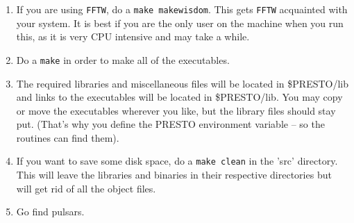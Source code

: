 \documentclass[11pt]{article}
\begin{document}
\begin{enumerate}
\item If you are using {\tt FFTW}, do a {\tt make makewisdom}.  This
  gets {\tt FFTW} acquainted with your system.  It is best if you are
  the only user on the machine when you run this, as it is very CPU
  intensive and may take a while.
  
\item Do a {\tt make} in order to make all of the executables.
  
\item The required libraries and miscellaneous files will be located
  in \$PRESTO/lib and links to the executables will be located in
  \$PRESTO/lib.  You may copy or move the executables wherever you
  like, but the library files should stay put.  (That's why you define
  the PRESTO environment variable -- so the routines can find them).
  
\item If you want to save some disk space, do a {\tt make clean} in
  the 'src' directory.  This will leave the libraries and binaries in
  their respective directories but will get rid of all the object
  files.
  
\item Go find pulsars.

\end{enumerate}
\end{document}
